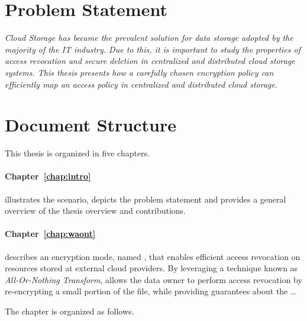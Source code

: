 \bigskip

\section{Problem Statement}

{\em Cloud Storage has became the prevalent solution for data storage adopted by the majority of the IT industry. Due to this, it is important to study the properties of access revocation and secure deletion in centralized and distributed cloud storage systems. This thesis presents how a carefully chosen encryption policy can efficiently map an access policy in centralized and distributed cloud storage.}

\bigskip

\section{Document Structure}


This thesis is organized in five chapters.

\smallskip

\paragraph*{Chapter~\ref{chap:intro}} illustrates the scenario, depicts the problem statement and provides a general overview of the thesis overview and contributions.

\paragraph*{Chapter~\ref{chap:waont}}
describes an encryption mode, named \name, that enables efficient access revocation on resources stored at external cloud providers. By leveraging a technique known as {\em All-Or-Nothing Transform}, \name allows the data owner to perform access revocation by re-encrypting a small portion of the file, while providing guarantees about the \ldots

\smallskip

The chapter is organized as follows.

